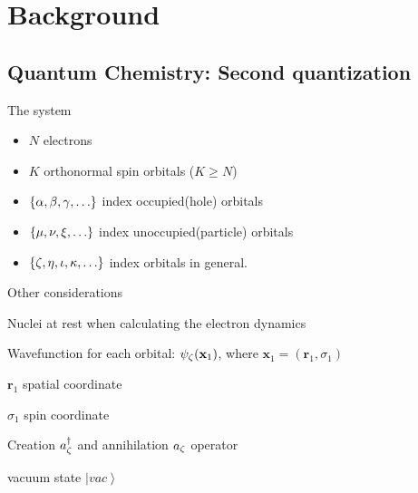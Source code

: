 \documentclass[professionalfonts]{beamer}
\newcommand{\bx}{\bm{x}}
\newcommand{\br}{\bm{r}}
\newcommand{\ket}[1]{\ensuremath{\left|#1\right\rangle}}
\newcommand{\paren}[1]{\left( #1 \right)}
\newcommand{\elec}{N}
\newcommand{\orb}{K}
\newcommand{\anig}[1]{a_{\go{#1}}}
\newcommand{\creg}[1]{a^\dagger_{\go{#1}}}
\newcommand{\vac}{\ket{vac}}
\newcommand{\uo}[1]{
		\IfEqCase{#1}{
			{0}{\mu}
			{1}{\nu}
			{2}{\xi}
		}[\PackageError{uo}{Undefined option to uo: #1}{}]
}
\newcommand{\oo}[1]{
		\IfEqCase{#1}{
			{0}{\alpha}
			{1}{\beta}
			{2}{\gamma}
		}[\PackageError{unocorb}{Undefined option to unuo: #1}{}]
}
\newcommand{\go}[1]{
		\IfEqCase{#1}{
			{0}{\zeta}
			{1}{\eta}
			{2}{\iota}
			{3}{\kappa}
		}[\PackageError{unocorb}{Undefined option to go: #1}{}]
}
\newcommand{\psig}[1]{
	\psi_{\go{#1}}
}
\newcommand{\SubItem}[1]{
    {\setlength\itemindent{15pt} \item[*] #1}
}
\begin{document}


\section{\textbf{Background}}

\subsection{\textbf{Quantum Chemistry: Second quantization}}

\begin{frame}{The system}
	\begin{itemize}
		\item $\elec$ electrons
		\item $\orb$ orthonormal spin orbitals ($\orb \geq \elec$)
		\item $\{\oo{0}, \oo{1}, \oo{2}, \ldots\}$ index occupied(hole) orbitals
		\item $\{\uo{0},\uo{1},\uo{2}, \ldots\}$ index unoccupied(particle) orbitals
		\item $\{\go{0}, \go{1}, \go{2}, \go{3}, \ldots\}$ index orbitals in general.
	\end{itemize}
\end{frame}



\begin{frame}{Other considerations}
	\begin{itemize}
		\item Nuclei at rest when calculating the electron dynamics
		\item Wavefunction for each orbital: $\psig 0(\mathbf{x}_1)$, where $\bx_1 = \paren{\br_1, \sigma_1}$
			\SubItem {$\br_1$ spatial coordinate}
			\SubItem {$\sigma_1$ spin coordinate}
		\item Creation $\creg{0}$ and annihilation $\anig{0}$ operator
		\item vacuum state $\vac$
	\end{itemize}
\end{frame}

\end{document}
